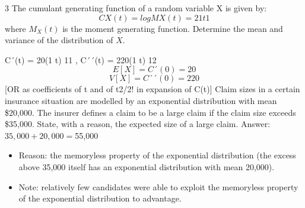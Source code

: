 \documentclass[a4paper,12pt]{article}
\begin{document}
3 The cumulant generating function of a random variable X is given by:
 \[CX (t) = logMX (t) = 2 1 t 1\]
where $M_X(t)$ is the moment generating function.
Determine the mean and variance of the distribution of $X$. 

 C´(t) = 20(1 t) 11 , C´´(t) = 220(1 t) 12
\[E[X] = C´(0) = 20\]
\[V[X] = C´´(0) = 220\]
[OR as coefficients of t and of t2/2! in expansion of C(t)]
 Claim sizes in a certain insurance situation are modelled by an exponential
distribution with mean \$20,000. The insurer defines a claim to be a large claim if the
claim size exceeds \$35,000.
State, with a reason, the expected size of a large claim. %
 Answer: $35,000 + 20,000 = $55,000
\begin{itemize}
    \item Reason: the memoryless property of the exponential distribution (the excess above
35,000 itself has an exponential distribution with mean 20,000).
\item Note: relatively few candidates were able to exploit the memoryless property of the
exponential distribution to advantage.
\end{itemize}
\end{document}
